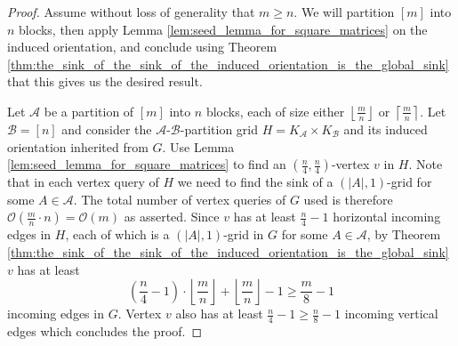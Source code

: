 \documentclass[a4paper,10pt]{article}
\newcommand{\A}{\ensuremath{\mathcal A}}
\newcommand{\B}{\ensuremath{\mathcal B}}
\begin{document}
\begin{proof}
 Assume without loss of generality that $m \geq n$. 
 We will partition $[m]$ into $n$ blocks, then apply Lemma \ref{lem:seed_lemma_for_square_matrices} on the induced orientation, and conclude using Theorem \ref{thm:the_sink_of_the_sink_of_the_induced_orientation_is_the_global_sink} that this  gives us the desired result. 
 
  Let $\A$ be a partition of $[m]$ into $n$ blocks, each of size either $\left\lfloor \frac{m}{n} \right\rfloor$ or $\left\lceil \frac{m}{n} \right\rceil$. Let $\B = [n]$ and 
consider the $\A$-$\B$-partition grid $H = K_\A\times K_\B$ and its induced orientation inherited from $G$. 
 Use Lemma \ref{lem:seed_lemma_for_square_matrices} to find an $(\frac{n}{4}, \frac{n}{4})$-vertex $v$ in $H$. 
 Note that in each vertex query of $H$ we need to find the sink of a $(|A|,1)$-grid for some $A\in \A$. 
 The total number of vertex queries of $G$ used is therefore $\mathcal{O}(\frac{m}{n}\cdot n) = \mathcal{O}(m)$ as asserted. 
 Since $v$ has at least $\frac{n}{4} - 1$ horizontal incoming edges in $H$, each of which is a $(|A|,1)$-grid in $G$ for some $A\in \A$, 
 by Theorem \ref{thm:the_sink_of_the_sink_of_the_induced_orientation_is_the_global_sink} $v$ has at least $$\left(\frac{n}{4} - 1\right)\cdot\left\lfloor \frac{m}{n} \right\rfloor + \left\lfloor \frac{m}{n} \right\rfloor - 1 \geq \frac{m}{8} - 1$$ incoming edges in $G$. 
 Vertex $v$ also has at least $\frac{n}{4} - 1 \geq \frac{n}{8} - 1$ incoming vertical edges which concludes the proof. 
\end{proof}


\end{document}
